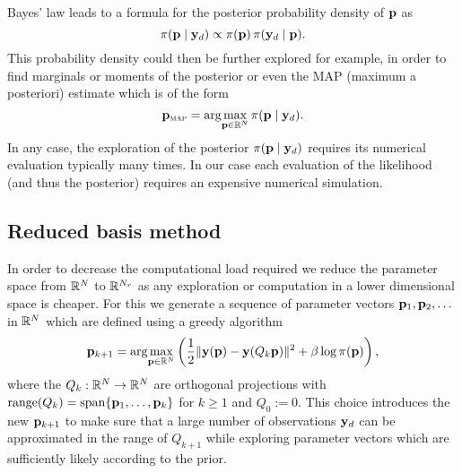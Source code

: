 Bayes' law leads to a formula for the posterior probability density of ${\mathbf{p}}$ as
\begin{equation}\label{eqn:bayes}
\pi({\mathbf{p}}\mid {\mathbf{y}}_d) \propto \pi({\mathbf{p}})\,\pi({\mathbf{y}}_d\mid {\mathbf{p}}).
\end{equation}
This probability density could then be further explored for example, in order to find marginals or
moments of the posterior or even the MAP (maximum a posteriori) estimate which is of the form
\begin{equation}\label{eqn:PMAPfull}
{\mathbf{p}}_{\operatorname{\textsc{map}}} = \arg\!\max_{{\mathbf{p}}\in{\mathbb R}^N} \pi({\mathbf{p}}\mid {\mathbf{y}}_d).
\end{equation}
In any case, the exploration of the posterior $\pi({\mathbf{p}}\mid {\mathbf{y}}_d)$ requires its numerical evaluation typically many times. 
In our case each evaluation of the likelihood (and thus the posterior) 
requires an expensive numerical simulation.

\subsection{Reduced basis method}

In order to decrease the computational load required we reduce the parameter space from ${\mathbb R}^N$ to ${\mathbb R}^{N_r}$ as any exploration or computation in a lower dimensional space is cheaper. 
For this we generate a sequence of parameter vectors ${\mathbf{p}}_1, {\mathbf{p}}_2,\ldots$ in ${\mathbb R}^N$ which are defined using a greedy algorithm %
\begin{equation}\label{eq:greedyOpt}
{\mathbf{p}}_{k+1} = \arg\!\max_{{\mathbf{p}}\in{\mathbb R}^N} \left(\frac{1}{2}\|{\mathbf{y}}({\mathbf{p}})-{\mathbf{y}}(Q_k {\mathbf{p}})\|^2 + \beta \log \pi({\mathbf{p}})\right),
\end{equation}
where the $Q_k:{\mathbb R}^N\rightarrow {\mathbb R}^N$ are orthogonal projections with 
$\operatorname{range}(Q_k)=\operatorname{span}\{{\mathbf{p}}_1,\ldots,{\mathbf{p}}_k\}$ for $k\geq 1$ and $Q_0:=0$. 
This choice introduces the new ${\mathbf{p}}_{k+1}$ to make sure that a large number of observations ${\mathbf{y}}_d$ can be approximated in the range of $Q_{k+1}$ while exploring parameter vectors which are sufficiently likely according to the prior.

